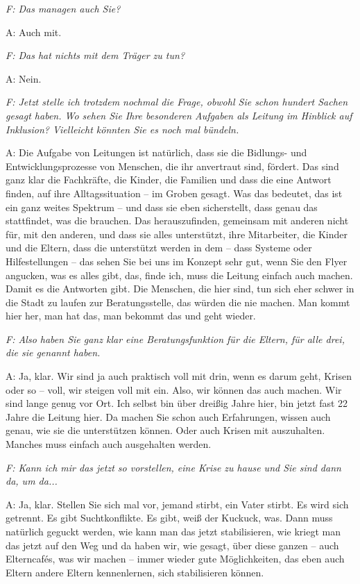 \begin{linenumbers*}
\emph{F: Das managen auch Sie?}

A: Auch mit. 

\emph{F: Das hat nichts mit dem Träger zu tun?}

A: Nein.

\emph{F: Jetzt stelle ich trotzdem nochmal die Frage, obwohl Sie schon hundert Sachen gesagt haben. Wo sehen Sie Ihre besonderen Aufgaben als Leitung im Hinblick auf Inklusion? Vielleicht könnten Sie es noch mal bündeln.} 

A: Die Aufgabe von Leitungen ist natürlich, dass sie die Bidlungs- und Entwicklungsprozesse von Menschen, die ihr anvertraut sind, fördert. Das sind ganz klar die Fachkräfte, die Kinder, die Familien und dass die eine Antwort finden, auf ihre Alltagssituation -- im Groben gesagt. Was das bedeutet, das ist ein ganz weites Spektrum -- und dass sie eben sicherstellt, dass genau das stattfindet, was die brauchen. Das herauszufinden, gemeinsam mit anderen nicht für, mit den anderen, und dass sie alles unterstützt, ihre Mitarbeiter, die Kinder und die Eltern, dass die unterstützt werden in dem -- dass Systeme oder Hilfestellungen -- das sehen Sie bei uns im Konzept sehr gut, wenn Sie den Flyer angucken, was es alles gibt, das, finde ich, muss die Leitung einfach auch machen. Damit es die Antworten gibt. Die Menschen, die hier sind, tun sich eher schwer in die Stadt zu laufen zur Beratungsstelle, das würden die nie machen. Man kommt hier her, man hat das, man bekommt das und geht wieder. 

\emph{F: Also haben Sie ganz klar eine Beratungsfunktion für die Eltern, für alle drei, die sie genannt haben.}

A: Ja, klar. Wir sind ja auch praktisch voll mit drin, wenn es darum geht, Krisen oder so -- voll, wir steigen voll mit ein. Also, wir können das auch machen. Wir sind lange genug vor Ort. Ich selbst bin über dreißig Jahre hier, bin jetzt fast 22 Jahre die Leitung hier. Da machen Sie schon auch Erfahrungen, wissen auch genau, wie sie die unterstützen können. Oder auch Krisen mit auszuhalten. Manches muss einfach auch ausgehalten werden. 

\emph{F: Kann ich mir das jetzt so vorstellen, eine Krise zu hause und Sie sind dann da, um da...}

A: Ja, klar. Stellen Sie sich mal vor, jemand stirbt, ein Vater stirbt. Es wird sich getrennt. Es gibt Suchtkonflikte. Es gibt, weiß der Kuckuck, was. Dann muss natürlich geguckt werden, wie kann man das jetzt stabilisieren, wie kriegt man das jetzt auf den Weg und da haben wir, wie gesagt, über diese ganzen -- auch Elterncafés, was wir machen -- immer wieder gute Möglichkeiten, das eben auch Eltern andere Eltern kennenlernen, sich stabilisieren können. 


\end{linenumbers*}
